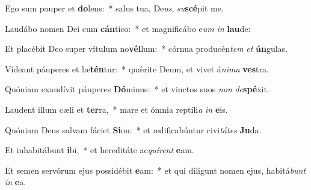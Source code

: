 \item Ego sum pauper et \textbf{do}lens:~* salus tua, De\textit{us}, \textit{su}\textbf{scé}pit me.
\item Laudábo nomen Dei cum \textbf{cán}tico:~* et magnificábo e\textit{um} \textit{in} \textbf{lau}de:
\item Et placébit Deo super vítulum no\textbf{vél}lum:~* córnua producén\textit{tem} \textit{et} \textbf{ún}gulas.
\item Vídeant páuperes et læ\textbf{tén}tur:~* quǽrite Deum, et vivet á\textit{ni}\textit{ma} \textbf{ves}tra.
\item Quóniam exaudívit páuperes \textbf{Dó}minus:~* et vinctos suos \textit{non} \textit{de}\textbf{spé}xit.
\item Laudent illum cæli et \textbf{ter}ra,~* mare et ómnia reptíli\textit{a} \textit{in} \textbf{e}is.
\item Quóniam Deus salvam fáciet \textbf{Si}on:~* et ædificabúntur civi\textit{tá}\textit{tes} \textbf{Ju}da.
\item Et inhabitábunt \textbf{i}bi,~* et hereditáte ac\textit{quí}\textit{rent} \textbf{e}am.
\item Et semen servórum ejus possidébit \textbf{e}am:~* et qui díligunt nomen ejus, habitá\textit{bunt} \textit{in} \textbf{e}a.
